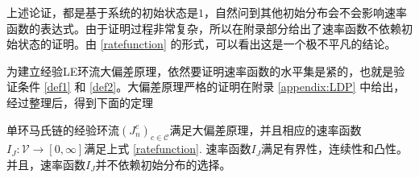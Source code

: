 上述论证，都是基于系统的初始状态是$1$，自然问到其他初始分布会不会影响速率函数的表达式。由于证明过程非常复杂，所以在附录部分给出了速率函数不依赖初始状态的证明。由 \eqref{ratefunction} 的形式，可以看出这是一个极不平凡的结论。

为建立经验LE环流大偏差原理，依然要证明速率函数的水平集是紧的，也就是验证条件 \eqref{def1} 和 \eqref{def2}。大偏差原理严格的证明在附录 \ref{appendix:LDP} 中给出，经过整理后，得到下面的定理

\begin{theorem}\label{thm:LDP}
    单环马氏链的经验环流$(J^c_n)_{c\in\mathcal{C}}$满足大偏差原理，并且相应的速率函数$I_J:\mathcal{V}\to [0,\infty]$满足上式 \eqref{ratefunction}. 速率函数$I_J$满足有界性，连续性和凸性。并且，速率函数$I_J$并不依赖初始分布的选择。
\end{theorem}

